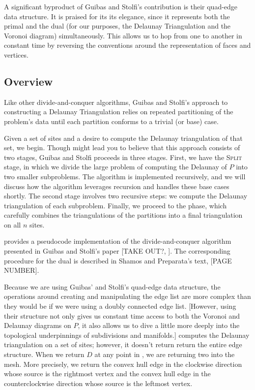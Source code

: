 \documentclass[12pt,twoside]{reedthesis}
\begin{document}
    A significant byproduct of Guibas and Stolfi's contribution is their quad-edge data structure. It is praised for its its elegance, since it represents both the primal and the dual (for our purposes, the Delaunay Triangulation and the Voronoi diagram) simultaneously. This allows us to hop from one to another in constant time by reversing the conventions around the representation of faces and vertices.\par

  \subsection{Overview}
  \label{sub:gs_sketch}
    Like other divide-and-conquer algorithms, Guibas and Stolfi's approach to constructing a Delaunay Triangulation relies on repeated partitioning of the problem's data until each partition conforms to a trivial (or base) case.\par

    Given a set of sites and a desire to compute the Delaunay triangulation of that set, we begin. Though  might lead you to believe that this approach consists of two stages, Guibas and Stolfi proceeds in three stages. First, we have the \textsc{Split} stage, in which we divide the large problem of computing the Delaunay of $P$ into two smaller subproblems. The algorithm is implemented recursively, and we will discuss how the algorithm leverages recursion and handles these base cases shortly. The second stage involves two recursive steps: we compute the Delaunay triangulation of each subproblem. Finally, we proceed to the  phase, which carefully combines the triangulations of the partitions into a final triangulation on all $n$ sites. \par

     provides a pseudocode implementation of the divide-and-conquer algorithm presented in Guibas and Stolfi's paper [TAKE OUT?, \citealp{guibas}]. The corresponding procedure for the dual is described in Shamos and Preparata's text, \citealp{shamos}[PAGE NUMBER].\par

    Because we are using Guibas’ and Stolfi’s quad-edge data structure, the operations around creating and manipulating the edge list are more complex than they would be if we were using a doubly connected edge list. [However, using their structure not only gives us constant time access to both the Voronoi and Delaunay diagrams on $P$, it also allows us to dive a little more deeply into the topological underpinnings of subdivisions and manifolds.]  computes the Delaunay triangulation on a set of sites; however, it doesn't return return the entire edge structure. When we return $D$ at any point in , we are returning two  into the mesh. More precisely, we return the convex hull edge in the clockwise direction whose source is the rightmost vertex and the convex hull edge in the counterclockwise direction whose source is the leftmost vertex.\par 
\end{document}
